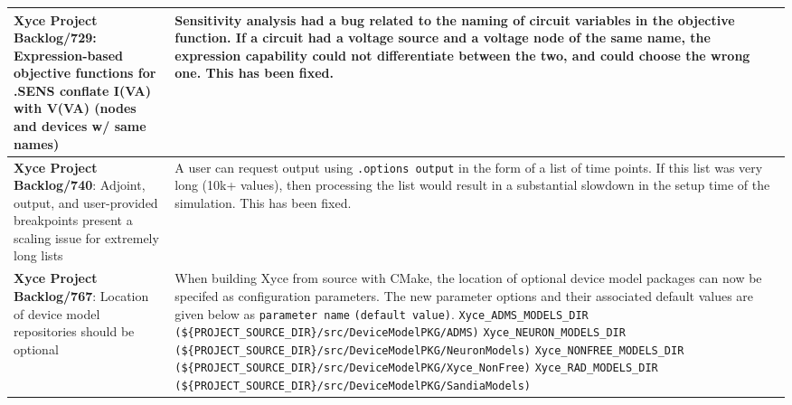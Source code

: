 {\begin{longtable}[h] {>{\raggedright\small}m{2in}|>{\raggedright\let\\\tabularnewline\small}m{3.5in}}
\textbf{Xyce Project Backlog/729}: 
Expression-based objective functions for .SENS conflate I(VA) with V(VA) (nodes and devices w/ same names)
& Sensitivity analysis had a bug related to the naming of circuit variables in the objective function.
If a circuit had a voltage source and a voltage node of the same name, the expression capability could not differentiate between the two, and could choose the wrong one.  This has been fixed. \\ \hline

\textbf{Xyce Project Backlog/740}: Adjoint, output, and user-provided breakpoints present a scaling issue for
extremely long lists & A user can request output using \texttt{.options output}
in the form of a list of time points.  If this list was very long (10k+ values),
then processing the list would result in a substantial slowdown in the setup time of the 
simulation.  This has been fixed. \\ \hline

\textbf{Xyce Project Backlog/767}: Location of device model repositories 
should be optional & When building Xyce from source with CMake, the 
location of optional device model packages can now be specifed as 
configuration parameters. The new parameter options and their 
associated default values are given below as \texttt{parameter name} 
\texttt{(default value)}. \newline
\texttt{Xyce\_ADMS\_MODELS\_DIR} \texttt{(\$\{PROJECT\_SOURCE\_DIR\}/src/DeviceModelPKG/ADMS)} \newline
\texttt{Xyce\_NEURON\_MODELS\_DIR} \texttt{(\$\{PROJECT\_SOURCE\_DIR\}/src/DeviceModelPKG/NeuronModels)} \newline
\texttt{Xyce\_NONFREE\_MODELS\_DIR} \texttt{(\$\{PROJECT\_SOURCE\_DIR\}/src/DeviceModelPKG/Xyce\_NonFree)} \newline
\texttt{Xyce\_RAD\_MODELS\_DIR} \texttt{(\$\{PROJECT\_SOURCE\_DIR\}/src/DeviceModelPKG/SandiaModels)} \newline
\\ \hline

\end{longtable}
}
